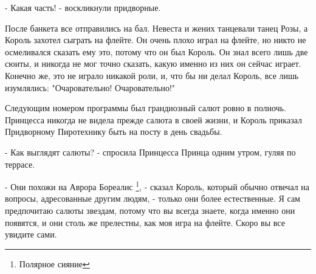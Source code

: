\documentclass[a4paper]{article}
\theoremstyle{col}
\begin{document}
- Какая часть! - воскликнули придворные.

После банкета все отправились на бал. Невеста и жених танцевали танец Розы, а Король захотел сыграть на флейте. Он очень плохо играл на флейте, но никто не осмеливался сказать ему это, потому что он был Король. Он знал всего лишь две сюиты, и никогда не мог точно сказать, какую именно из них он сейчас играет. Конечно же, это не играло никакой роли, и, что бы ни делал Король, все лишь изумлялись: "Очаровательно! Очаровательно!"

Следующим номером программы был грандиозный салют ровно в полночь. Принцесса никогда не видела прежде салюта в своей жизни, и Король приказал Придворному Пиротехнику быть на посту в день свадьбы.

- Как выглядят салюты? - спросила Принцесса Принца одним утром, гуляя по террасе.

- Они похожи на Аврора Бореалис \footnote{Полярное сияние}, - сказал Король, который обычно отвечал на вопросы, адресованные другим людям, - только они более естественные. Я сам предпочитаю салюты звездам, потому что вы всегда знаете, когда именно они появятся, и они столь же прелестны, как моя игра на флейте. Скоро вы все увидите сами. 
\end{document}
